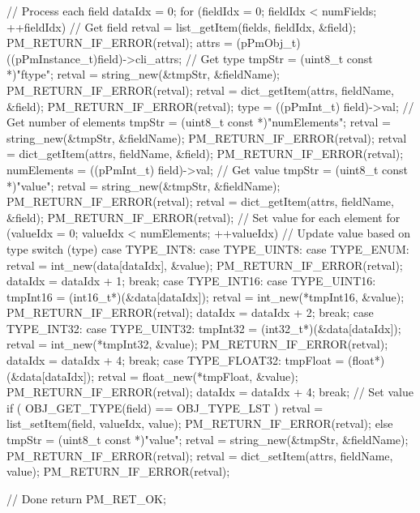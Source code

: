 \begin{DoxyVerb}
// Process each field
dataIdx = 0;
for (fieldIdx = 0; fieldIdx < numFields; ++fieldIdx)
{		
        // Get field
        retval = list_getItem(fields, fieldIdx, &field); PM_RETURN_IF_ERROR(retval);
        attrs = (pPmObj_t)((pPmInstance_t)field)->cli_attrs;
        // Get type
        tmpStr = (uint8_t const *)"ftype";
        retval = string_new(&tmpStr, &fieldName); PM_RETURN_IF_ERROR(retval); 
        retval = dict_getItem(attrs, fieldName, &field); PM_RETURN_IF_ERROR(retval);
        type = ((pPmInt_t) field)->val;   
        // Get number of elements
        tmpStr = (uint8_t const *)"numElements";
        retval = string_new(&tmpStr, &fieldName); PM_RETURN_IF_ERROR(retval); 
        retval = dict_getItem(attrs, fieldName, &field); PM_RETURN_IF_ERROR(retval);
        numElements = ((pPmInt_t) field)->val;
        // Get value
        tmpStr = (uint8_t const *)"value";
        retval = string_new(&tmpStr, &fieldName); PM_RETURN_IF_ERROR(retval); 
        retval = dict_getItem(attrs, fieldName, &field); PM_RETURN_IF_ERROR(retval); 
        // Set value for each element
        for (valueIdx = 0; valueIdx < numElements; ++valueIdx)
        {		
// Update value based on type    	
switch (type)  
{
        case TYPE_INT8: 
        case TYPE_UINT8:
        case TYPE_ENUM: 
                retval = int_new(data[dataIdx], &value); PM_RETURN_IF_ERROR(retval);                       
                dataIdx = dataIdx + 1;
                break;
        case TYPE_INT16:
        case TYPE_UINT16:
                tmpInt16 = (int16_t*)(&data[dataIdx]);
                retval = int_new(*tmpInt16, &value); PM_RETURN_IF_ERROR(retval);    
                dataIdx = dataIdx + 2;
                break;       
        case TYPE_INT32:
        case TYPE_UINT32:
                tmpInt32 = (int32_t*)(&data[dataIdx]);
                retval = int_new(*tmpInt32, &value); PM_RETURN_IF_ERROR(retval);    
                dataIdx = dataIdx + 4;
                break;  
        case TYPE_FLOAT32:
                tmpFloat = (float*)(&data[dataIdx]);
                retval = float_new(*tmpFloat, &value); PM_RETURN_IF_ERROR(retval);    
                dataIdx = dataIdx + 4;
                break;    
}
// Set value 
if ( OBJ_GET_TYPE(field) == OBJ_TYPE_LST )
{
        retval = list_setItem(field, valueIdx, value); PM_RETURN_IF_ERROR(retval); 
}
else
{
        tmpStr = (uint8_t const *)"value";
        retval = string_new(&tmpStr, &fieldName); PM_RETURN_IF_ERROR(retval); 
        retval = dict_setItem(attrs, fieldName, value); PM_RETURN_IF_ERROR(retval); 
}
        }
}

// Done
return PM_RET_OK;
\end{DoxyVerb}
 

